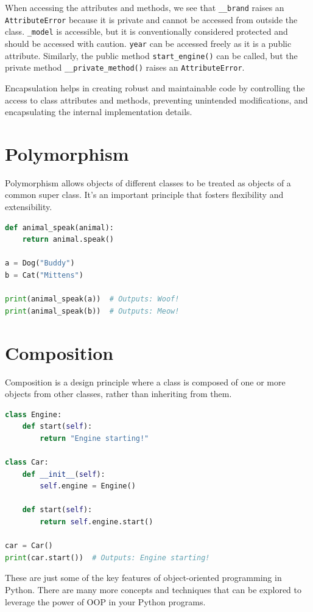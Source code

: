 \documentclass[12pt]{book}
\begin{document}
When accessing the attributes and methods, we see that \texttt{\_\_brand} raises an \texttt{AttributeError} because it is private and cannot be accessed from outside the class. \texttt{\_model} is accessible, but it is conventionally considered protected and should be accessed with caution. \texttt{year} can be accessed freely as it is a public attribute. Similarly, the public method \texttt{start\_engine()} can be called, but the private method \texttt{\_\_private\_method()} raises an \texttt{AttributeError}.

Encapsulation helps in creating robust and maintainable code by controlling the access to class attributes and methods, preventing unintended modifications, and encapsulating the internal implementation details.

\section{Polymorphism}
Polymorphism allows objects of different classes to be treated as objects of a common super class. It's an important principle that fosters flexibility and extensibility.

\begin{lstlisting}[language=Python]
def animal_speak(animal):
    return animal.speak()

a = Dog("Buddy")
b = Cat("Mittens")

print(animal_speak(a))  # Outputs: Woof!
print(animal_speak(b))  # Outputs: Meow!
\end{lstlisting}

\section{Composition}
Composition is a design principle where a class is composed of one or more objects from other classes, rather than inheriting from them.

\begin{lstlisting}[language=Python]
class Engine:
    def start(self):
        return "Engine starting!"

class Car:
    def __init__(self):
        self.engine = Engine()

    def start(self):
        return self.engine.start()

car = Car()
print(car.start())  # Outputs: Engine starting!
\end{lstlisting}



These are just some of the key features of object-oriented programming in Python. There are many more concepts and techniques that can be explored to leverage the power of OOP in your Python programs.
\end{document}
